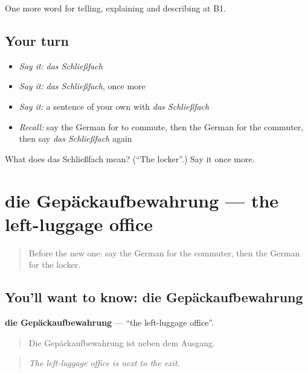 \begin{grammarlens}[title={What you've built}]
One more word for telling, explaining and describing at B1.
\end{grammarlens}

\subsection*{Your turn}
\begin{itemize}
\raggedright
  \item \emph{Say it:} \emph{das Schließfach}
  \item \emph{Say it:} \emph{das Schließfach}, once more
  \item \emph{Say it:} a sentence of your own with \emph{das Schließfach}
  \item \emph{Recall:} say the German for to commute, then the German for the commuter, then say \emph{das Schließfach} again
\end{itemize}

\begin{tcolorbox}[breakable,colback=teal!4,colframe=teal!35!black,title={Before you move on}]
What does das Schließfach mean? (\textquotedblleft{}The locker\textquotedblright{}.) Say it once more.
\end{tcolorbox}
\section[die Gepäckaufbewahrung]{die Gepäckaufbewahrung — the left-luggage office}

\label{lesson:GE-C415-gepaeckaufbewahrung}



\begin{quote}
Before the new one: say the German for the commuter, then the German for the locker.
\end{quote}

\subsection*{You'll want to know: die Gepäckaufbewahrung}
\textbf{die Gepäckaufbewahrung} — \textquotedblleft{}the left-luggage office\textquotedblright{}.

\begin{quote}
Die Gepäckaufbewahrung ist neben dem Ausgang.
\end{quote}

\begin{quote}
\emph{The left-luggage office is next to the exit.}
\end{quote}

